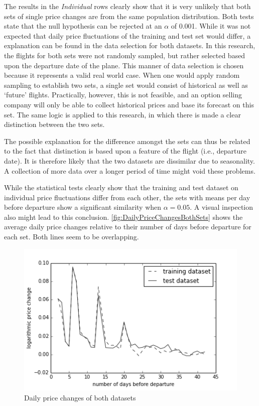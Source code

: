 The results in the \emph{Individual} rows clearly show that it is very unlikely that both sets of single price changes are from the same population distribution. Both tests state that the null hypothesis can be rejected at an $\alpha$ of 0.001. While it was not expected that daily price fluctuations of the training and test set would differ, a explanation can be found in the data selection for both datasets. In this research, the flights for both sets were not randomly sampled, but rather selected based upon the departure date of the plane. This manner of data selection is chosen because it represents a valid real world case. When one would apply random sampling to establish two sets, a single set would consist of historical as well as `future' flights. Practically, however, this is not feasible, and an option selling company will only be able to collect historical prices and base its forecast on this set. The same logic is applied to this research, in which there is made a clear distinction between the two sets.

The possible explanation for the difference amongst the sets can thus be related to the fact that distinction is based upon a feature of the flight (i.e., departure date). It is therefore likely that the two datasets are dissimilar due to seasonality. A collection of more data over a longer period of time might void these problems.

While the statistical tests clearly show that the training and test dataset on individual price fluctuations differ from each other, the sets with means per day before departure show a significant similarity when $\alpha = 0.05$. A visual inspection also might lead to this conclusion. \autoref{fig:DailyPriceChangesBothSets} shows the average daily price changes relative to their number of days before departure for each set. Both lines seem to be overlapping.


\begin{figure}
\centering
\includegraphics[width=.8\textwidth]{figures/Train-Test_DailyReturns}
\caption{Daily price changes of both datasets}
\label{fig:DailyPriceChangesBothSets}
\end{figure}


